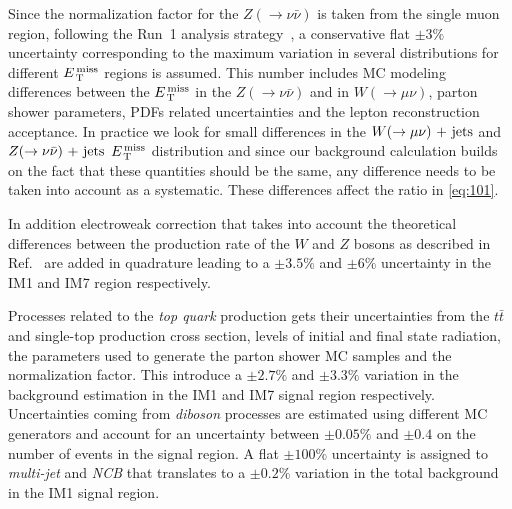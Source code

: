 Since the normalization factor for the $Z(\rightarrow \nu \bar{\nu})$ is taken
from the single muon region, following the Run~1 analysis
strategy~\cite{RunIPaper}, a conservative flat $\pm 3\%$ uncertainty
corresponding to the maximum variation in several distributions for different
$E_\mathrm{\, T}^\mathrm{\, miss}$ regions is assumed. This number includes MC modeling differences between
the $E_\mathrm{\, T}^\mathrm{\, miss}$ in the $Z(\rightarrow \nu \bar{\nu})$ and in
$W(\rightarrow \mu \nu)$, parton shower parameters, PDFs related uncertainties
and the lepton reconstruction acceptance. In practice we look for small
differences in the $W (\rightarrow \mu \nu)\mathrm{~+~jets}$ and $Z (\rightarrow \nu \bar{\nu})\mathrm{~+~jets}$ $E_\mathrm{\, T}^\mathrm{\, miss}$ distribution and
since our background calculation builds on the fact that these quantities should
be the same, any difference needs to be taken into account as a
systematic. These differences affect the ratio in \cref{eq:101}.

In addition electroweak correction that takes into account the theoretical
differences between the production rate of the $W$ and $Z$ bosons as described
in Ref.~\cite{EWCorrections} are added in quadrature leading to a $\pm 3.5\%$
and $\pm 6\%$ uncertainty in the IM1 and IM7 region respectively.

Processes related to the \emph{top quark} production gets their uncertainties
from the $t \bar{t}$ and single-top production cross section, levels of initial
and final state radiation, the parameters used to generate the parton shower MC
samples and the normalization factor. This introduce a $\pm 2.7\%$ and
$\pm 3.3 \%$ variation in the background estimation in the IM1 and IM7 signal
region respectively. Uncertainties coming from \emph{diboson} processes are
estimated using different MC generators and account for an uncertainty between
$\pm 0.05\%$ and $\pm 0.4$ on the number of events in the signal region. A flat
$\pm 100\%$ uncertainty is assigned to \emph{multi-jet} and \emph{NCB} that
translates to a $\pm 0.2\%$ variation in the total background in the IM1 signal
region.
